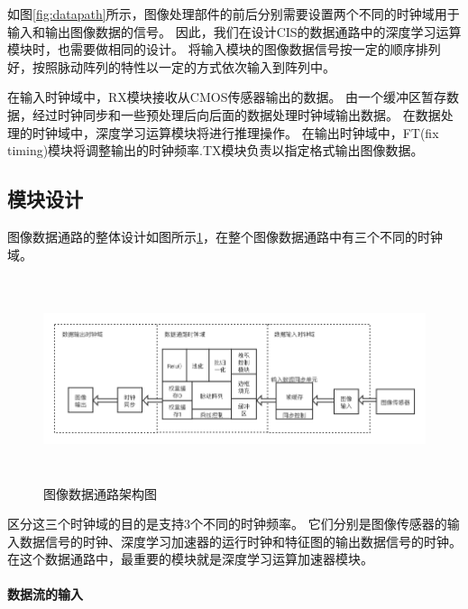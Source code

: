 如图\ref{fig:datapath}所示，图像处理部件的前后分别需要设置两个不同的时钟域用于输入和输出图像数据的信号。
因此，我们在设计CIS的数据通路中的深度学习运算模块时，也需要做相同的设计。
将输入模块的图像数据信号按一定的顺序排列好，按照脉动阵列的特性以一定的方式依次输入到阵列中。


在输入时钟域中，RX模块接收从CMOS传感器输出的数据。
由一个缓冲区暂存数据，经过时钟同步和一些预处理后向后面的数据处理时钟域输出数据。
在数据处理的时钟域中，深度学习运算模块将进行推理操作。
在输出时钟域中，FT(fix timing)模块将调整输出的时钟频率.TX模块负责以指定格式输出图像数据。  




\subsection{模块设计}
图像数据通路的整体设计如图所示\ref{fig:image_datapath}，在整个图像数据通路中有三个不同的时钟域。
\begin{figure}[htbp]
    \centering
    \includegraphics[width=15cm,height=6cm]{figures/image_datapath.png}
    \caption{图像数据通路架构图}
    \label{fig:image_datapath}
\end{figure}
区分这三个时钟域的目的是支持3个不同的时钟频率。
它们分别是图像传感器的输入数据信号的时钟、深度学习加速器的运行时钟和特征图的输出数据信号的时钟。
在这个数据通路中，最重要的模块就是深度学习运算加速器模块。


\paragraph{数据流的输入}

